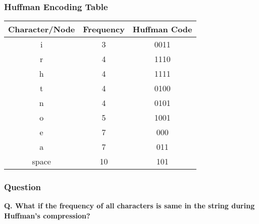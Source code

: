 \documentclass[10pt,aspectratio=43]{beamer}
\begin{document}
\begin{frame}
    \frametitle{\textcolor{myMaroon}{Huffman Encoding Table}}
    
    \begin{center}
        \begin{tabular}{c c c}
            \toprule
            \textcolor{myMaroon}{\textbf{Character/Node}} & 
            \textcolor{myMaroon}{\textbf{Frequency}} & 
            \textcolor{myMaroon}{\textbf{Huffman Code}} \\
            \midrule
            i & 3 & 0011 \\[0.2cm]
            r & 4 & 1110 \\[0.2cm]
            h & 4 & 1111 \\[0.2cm]
            t & 4 & 0100 \\[0.2cm]
            n & 4 & 0101 \\[0.2cm]
            o & 5 & 1001 \\[0.2cm]
            e & 7 & 000 \\[0.2cm]
            a & 7 & 011 \\[0.2cm]
            space & 10 & 101 \\[0.2cm]
            
            \bottomrule
        \end{tabular}
    \end{center}
\end{frame}







\begin{frame}
    \frametitle{\textcolor{myMaroon}Question}

    \begin{center}
        \begin{tcolorbox}[
            colback=gray!10,
            colframe=black!60,
            boxrule=0.5pt,
            width=9.5cm,
            halign=left
        ]
            \small
            \textbf{Q. What if the frequency of all characters is same in the string during Huffman's compression?}
        \end{tcolorbox}
    \end{center}

\end{frame}
\end{document}
